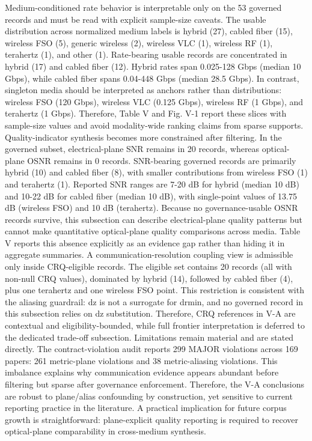 {}Medium-conditioned rate behavior is interpretable only on the 53 governed records and must be read with explicit sample-size caveats. The usable distribution across normalized medium labels is hybrid (27), cabled fiber (15), wireless FSO (5), generic wireless (2), wireless VLC (1), wireless RF (1), terahertz (1), and other (1). Rate-bearing usable records are concentrated in hybrid (17) and cabled fiber (12). Hybrid rates span 0.025-128 Gbps (median 10 Gbps), while cabled fiber spans 0.04-448 Gbps (median 28.5 Gbps). In contrast, singleton media should be interpreted as anchors rather than distributions: wireless FSO (120 Gbps), wireless VLC (0.125 Gbps), wireless RF (1 Gbps), and terahertz (1 Gbps). Therefore, Table V and Fig. V-1 report these slices with sample-size values and avoid modality-wide ranking claims from sparse supports.\markdownRendererParagraphSeparator
{}Quality-indicator synthesis becomes more constrained after filtering. In the governed subset, electrical-plane SNR remains in 20 records, whereas optical-plane OSNR remains in 0 records. SNR-bearing governed records are primarily hybrid (10) and cabled fiber (8), with smaller contributions from wireless FSO (1) and terahertz (1). Reported SNR ranges are 7-20 dB for hybrid (median 10 dB) and 10-22 dB for cabled fiber (median 10 dB), with single-point values of 13.75 dB (wireless FSO) and 10 dB (terahertz). Because no governance-usable OSNR records survive, this subsection can describe electrical-plane quality patterns but cannot make quantitative optical-plane quality comparisons across media. Table V reports this absence explicitly as an evidence gap rather than hiding it in aggregate summaries.\markdownRendererParagraphSeparator
{}A communication-resolution coupling view is admissible only inside CRQ-eligible records. The eligible set contains 20 records (all with non-null CRQ values), dominated by hybrid (14), followed by cabled fiber (4), plus one terahertz and one wireless FSO point. This restriction is consistent with the aliasing guardrail: dz is not a surrogate for drmin, and no governed record in this subsection relies on dz substitution. Therefore, CRQ references in V-A are contextual and eligibility-bounded, while full frontier interpretation is deferred to the dedicated trade-off subsection.\markdownRendererParagraphSeparator
{}Limitations remain material and are stated directly. The contract-violation audit reports 299 MAJOR violations across 169 papers: 261 metric-plane violations and 38 metric-aliasing violations. This imbalance explains why communication evidence appears abundant before filtering but sparse after governance enforcement. Therefore, the V-A conclusions are robust to plane/alias confounding by construction, yet sensitive to current reporting practice in the literature. A practical implication for future corpus growth is straightforward: plane-explicit quality reporting is required to recover optical-plane comparability in cross-medium synthesis.\markdownRendererParagraphSeparator
